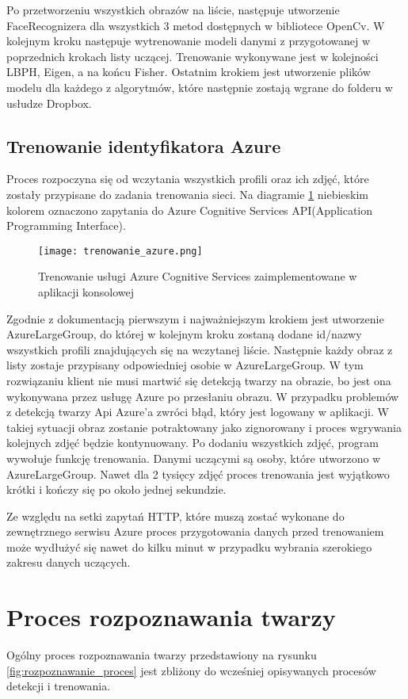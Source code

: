 Po przetworzeniu wszystkich obrazów na liście, następuje utworzenie FaceRecognizera dla wszystkich 3 metod dostępnych w bibliotece OpenCv. W kolejnym kroku następuje wytrenowanie modeli danymi z przygotowanej w poprzednich krokach listy uczącej. Trenowanie wykonywane jest w kolejności LBPH, Eigen, a na końcu Fisher. Ostatnim krokiem jest utworzenie plików modelu dla każdego z algorytmów, które następnie zostają wgrane do folderu w usłudze Dropbox.


\subsection{Trenowanie identyfikatora Azure} \label{trenowanie_azure}
Proces rozpoczyna się od wczytania wszystkich profili oraz ich zdjęć, które zostały przypisane do zadania trenowania sieci. Na diagramie \ref{fig:trenowanie_azure} niebieskim kolorem oznaczono zapytania do Azure Cognitive Services API(Application Programming Interface).
\begin{figure}[H]
	\centering
	\texttt{[image: trenowanie\_azure.png]}
	\caption{Trenowanie usługi Azure Cognitive Services zaimplementowane w aplikacji konsolowej}
	\label{fig:trenowanie_azure}
\end{figure}
Zgodnie z dokumentacją \cite{acs_doc} pierwszym i najważniejszym krokiem jest utworzenie AzureLargeGroup, do której w kolejnym kroku zostaną dodane id/nazwy wszystkich profili znajdujących się na wczytanej liście.  Następnie każdy obraz z listy zostaje przypisany odpowiedniej osobie w AzureLargeGroup. W tym rozwiązaniu klient nie musi martwić się detekcją twarzy na obrazie, bo jest ona wykonywana przez usługę Azure po przesłaniu obrazu. W przypadku problemów z detekcją twarzy Api Azure'a zwróci błąd, który jest logowany w aplikacji. W takiej sytuacji obraz zostanie potraktowany jako zignorowany i proces wgrywania kolejnych zdjęć będzie kontynuowany. Po dodaniu wszystkich zdjęć, program wywołuje funkcję trenowania. Danymi uczącymi są osoby, które utworzono w AzureLargeGroup. Nawet dla 2 tysięcy zdjęć proces trenowania jest wyjątkowo krótki i kończy się po około jednej sekundzie.

Ze względu na setki zapytań HTTP, które muszą zostać wykonane do zewnętrznego serwisu Azure proces przygotowania danych przed trenowaniem może wydłużyć się nawet do kilku minut w przypadku wybrania szerokiego zakresu danych uczących.

\section{Proces rozpoznawania twarzy}\label{s:proces_rozpoznawania}
Ogólny proces rozpoznawania twarzy przedstawiony na rysunku \ref{fig:rozpoznawanie_proces} jest zbliżony do wcześniej opisywanych procesów detekcji i trenowania. 

